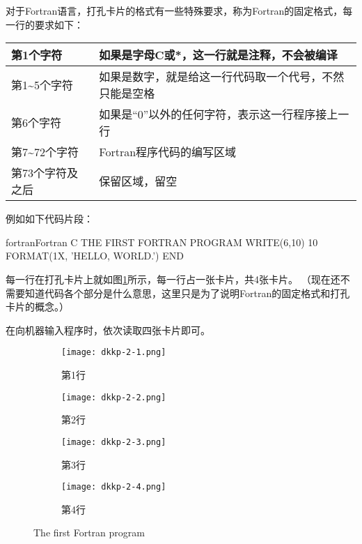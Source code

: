 对于Fortran语言，打孔卡片的格式有一些特殊要求，称为Fortran的固定格式，每一行的要求如下：

\begin{center}

\begin{table}[!h]
        \centering
        
\begin{tabular}{|p{}|p{}|}
\hline 
 第1个字符 & 如果是字母C或*，这一行就是注释，不会被编译 \\
\hline 
 第1\textasciitilde 5个字符 & 如果是数字，就是给这一行代码取一个代号，不然只能是空格 \\
\hline 
 第6个字符 & 如果是“0”以外的任何字符，表示这一行程序接上一行 \\
\hline 
 第7\textasciitilde 72个字符 & Fortran程序代码的编写区域 \\
\hline 
 第73个字符及之后 & 保留区域，留空 \\
 \hline
\end{tabular}
        
        \end{table}
\end{center}

例如如下代码片段：
\begin{envcode}{fortran}{Fortran}
C THE FIRST FORTRAN PROGRAM
      WRITE(6,10)
   10 FORMAT(1X, 'HELLO, WORLD.')
      END
\end{envcode}
每一行在打孔卡片上就如图\ref{fig:dkkp-2}所示，每一行占一张卡片，共4张卡片。
（现在还不需要知道代码各个部分是什么意思，这里只是为了说明Fortran的固定格式和打孔卡片的概念。）

在向机器输入程序时，依次读取四张卡片即可。

\begin{figure}[h]
    \centering
    \begin{subfigure}[c]{0.48\textwidth}
      \texttt{[image: dkkp-2-1.png]}
      \caption{第1行}
    \end{subfigure}
    \hfill
    \begin{subfigure}[c]{0.48\textwidth}
      \texttt{[image: dkkp-2-2.png]}
      \caption{第2行}
    \end{subfigure}
    \hfill
    \begin{subfigure}[c]{0.48\textwidth}
      \texttt{[image: dkkp-2-3.png]}
      \caption{第3行}
    \end{subfigure}
    \hfill
    \begin{subfigure}[c]{0.48\textwidth}
      \texttt{[image: dkkp-2-4.png]}
      \caption{第4行}
    \end{subfigure}    
    \caption{The first Fortran program}
    \label{fig:dkkp-2}
\end{figure}

